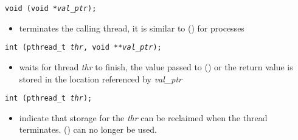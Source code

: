 \begin{slide}
\texttt{void (void *\emph{val\_ptr});}
\begin{itemize}
\item terminates the calling thread, it is similar to () for
processes
\end{itemize}
\texttt{int (pthread\_t \emph{thr},
void **\emph{val\_ptr});}
\begin{itemize}
\item waits for thread \emph{thr} to finish, the value passed to
() or the return value is stored in the location referenced
by \emph{val\_ptr}
\end{itemize}
\texttt{int (pthread\_t \emph{thr});}
\begin{itemize}
\item indicate that storage for the \emph{thr} can be reclaimed when the thread
terminates.  () can no longer be used.
\end{itemize}
\end{slide}

